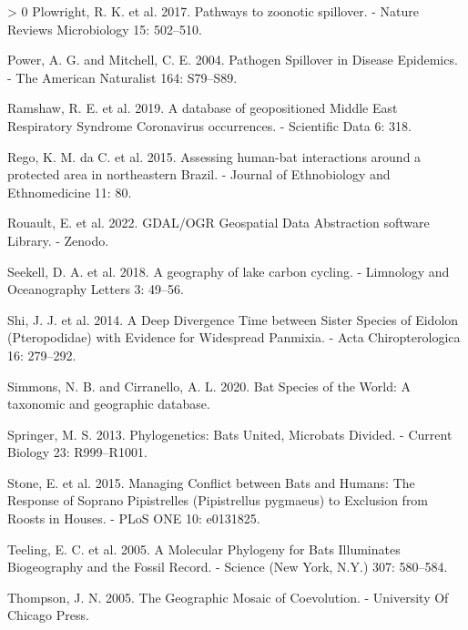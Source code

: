 \documentclass[11pt]{article}
\newlength{\cslhangindent}
\newenvironment{CSLReferences}[3] %
 {%
  \setlength{\parindent}{0pt}
  \ifodd #1 \everypar{\setlength{\hangindent}{\cslhangindent}}\ignorespaces\fi
  \ifnum #2 > 0
  \setlength{\parskip}{#2\baselineskip}
  \fi
 }%
 {}
\begin{document}
\begin{CSLReferences}{1}{0}
\leavevmode\hypertarget{ref-Plowright2017PatZoo}{}%
Plowright, R. K. et al. 2017. Pathways to zoonotic spillover. - Nature
Reviews Microbiology 15: 502--510.

\leavevmode\hypertarget{ref-Power2004PatSpi}{}%
Power, A. G. and Mitchell, C. E. 2004. Pathogen Spillover in Disease
Epidemics. - The American Naturalist 164: S79--S89.

\leavevmode\hypertarget{ref-Ramshaw2019DatGeo}{}%
Ramshaw, R. E. et al. 2019. A database of geopositioned Middle East
Respiratory Syndrome Coronavirus occurrences. - Scientific Data 6: 318.

\leavevmode\hypertarget{ref-Rego2015AssHum}{}%
Rego, K. M. da C. et al. 2015. Assessing human-bat interactions around a
protected area in northeastern Brazil. - Journal of Ethnobiology and
Ethnomedicine 11: 80.

\leavevmode\hypertarget{ref-RouaultEven2022GdaOgr}{}%
Rouault, E. et al. 2022. GDAL/OGR Geospatial Data Abstraction software
Library. - Zenodo.

\leavevmode\hypertarget{ref-Seekell2018GeoLak}{}%
Seekell, D. A. et al. 2018. A geography of lake carbon cycling. -
Limnology and Oceanography Letters 3: 49--56.

\leavevmode\hypertarget{ref-Shi2014DeeDiv}{}%
Shi, J. J. et al. 2014. A Deep Divergence Time between Sister Species of
Eidolon (Pteropodidae) with Evidence for Widespread Panmixia. - Acta
Chiropterologica 16: 279--292.

\leavevmode\hypertarget{ref-Simmons2020BatSpe}{}%
Simmons, N. B. and Cirranello, A. L. 2020. Bat Species of the World: A
taxonomic and geographic database.

\leavevmode\hypertarget{ref-Springer2013PhyBat}{}%
Springer, M. S. 2013. Phylogenetics: Bats United, Microbats Divided. -
Current Biology 23: R999--R1001.

\leavevmode\hypertarget{ref-Stone2015ManCon}{}%
Stone, E. et al. 2015. Managing Conflict between Bats and Humans: The
Response of Soprano Pipistrelles (Pipistrellus pygmaeus) to Exclusion
from Roosts in Houses. - PLoS ONE 10: e0131825.

\leavevmode\hypertarget{ref-Teeling2005MolPhy}{}%
Teeling, E. C. et al. 2005. A Molecular Phylogeny for Bats Illuminates
Biogeography and the Fossil Record. - Science (New York, N.Y.) 307:
580--584.

\leavevmode\hypertarget{ref-Thompson2005GeoMos}{}%
Thompson, J. N. 2005. The Geographic Mosaic of Coevolution. - University
Of Chicago Press.


\end{CSLReferences}
\end{document}
